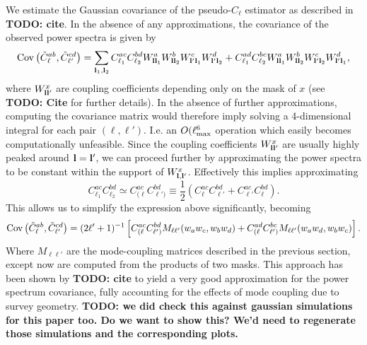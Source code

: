 \documentclass[a4paper,11pt]{article}
\newcommand{\todo}[1]{{\bf TODO: #1}}
\begin{document}
    We estimate the Gaussian covariance of the pseudo-$C_\ell$ estimator as described in \todo{cite}. In the absence of any approximations, the covariance of the observed power spectra is given by
    \begin{equation}
      {\rm Cov}\left(\tilde{C}^{ab}_\ell,\tilde{C}^{cd}_{\ell'}\right)=\sum_{{\bf l}_1,{\bf l}_2} C^{ac}_{\ell_1}C^{bd}_{\ell_2}W^a_{{\bf l}{\bf l}_1}W^b_{{\bf l}{\bf l}_2}W^c_{{\bf l}'{\bf l}_1}W^d_{{\bf l}'{\bf l}_2} + C^{ad}_{\ell_1}C^{bc}_{\ell_2}W^a_{{\bf l}{\bf l}_1}W^b_{{\bf l}{\bf l}_2}W^c_{{\bf l}'{\bf l}_2}W^d_{{\bf l}'{\bf l}_1},
    \end{equation}
    where $W^x_{{\bf l}{\bf l}'}$ are coupling coefficients depending only on the mask of $x$ (see \todo{Cite} for further details). In the absence of further approximations, computing the covariance matrix would therefore imply solving a 4-dimensional integral for each pair $(\ell,\ell')$. I.e. an $O(\ell_{\rm max}^6$ operation which easily becomes computationally unfeasible. Since the coupling coefficients $W^x_{{\bf l}{\bf l}'}$ are usually highly peaked around ${\bf l}={\bf l}'$, we can proceed further by approximating the power spectra to be constant within the support of $W^x_{{\bf l},{\bf l}'}$. Effectively this implies approximating
    \begin{equation}
      C^{ac}_{\ell_1}C^{bd}_{\ell_2}\simeq C^{ac}_{(\ell}C^{bd}_{\ell')}\equiv\frac{1}{2}\left(C^{ac}_\ell C^{bd}_{\ell'}+C^{ac}_{\ell'} C^{bd}_\ell\right).
    \end{equation}
    This allows us to simplify the expression above significantly, becoming
    \begin{equation}
      {\rm Cov}\left(\tilde{C}^{ab}_\ell,\tilde{C}^{cd}_{\ell'}\right)=(2\ell'+1)^{-1}\left[C^{ac}_{(\ell}C^{bd}_{\ell')}M_{\ell\ell'}(w_aw_c,w_bw_d)+C^{ad}_{(\ell}C^{bc}_{\ell')}M_{\ell\ell'}(w_aw_d,w_bw_c)\right].
    \end{equation}
    Where $M_{\ell\ell'}$ are the mode-coupling matrices described in the previous section, except now are computed from the products of two masks. This approach has been shown by \todo{cite} to yield a very good approximation for the power spectrum covariance, fully accounting for the effects of mode coupling due to survey geometry. \todo{we did check this against gaussian simulations for this paper too. Do we want to show this? We'd need to regenerate those simulations and the corresponding plots.}
    
\end{document}
